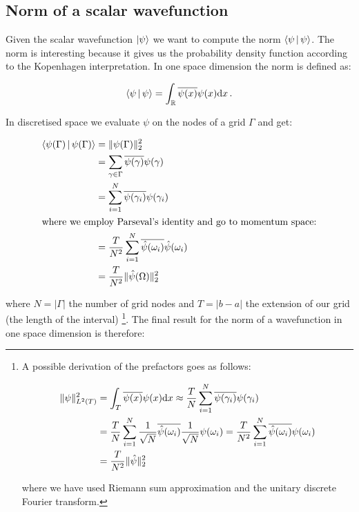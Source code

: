 \subsection{Norm of a scalar wavefunction}
\label{sec:norm_wf}


Given the scalar wavefunction $\Ket{\psi}$ we want to compute the norm $\Braket{\psi|\psi}$.
The norm is interesting because it gives us the probability density function
according to the Kopenhagen interpretation. In one space dimension the norm is
defined as:

\begin{equation*}
  \Braket{\psi|\psi} = \int_{\mathbb{R}} \overline{\psi(x)} \psi(x) \mathrm{d}x \,.
\end{equation*}

In discretised space we evaluate $\psi$ on the nodes of a grid $\Gamma$ and get:

\begin{align*}
  \Braket{\psi(\Gamma)|\psi(\Gamma)} & = \|\psi(\Gamma)\|^2_2 \\
                                     & = \sum_{\gamma \in \Gamma}  \overline{\psi(\gamma)} \psi(\gamma) \\
                                     & = \sum_{i=1}^{N} \overline{\psi(\gamma_i)} \psi(\gamma_i) \\
\intertext{where we employ Parseval's identity and go to momentum space:}
                                     & = \frac{T}{N^2} \sum_{i=1}^{N} \overline{\hat{\psi}(\omega_i)} \hat{\psi}(\omega_i) \\
                                     & = \frac{T}{N^2} \|\hat{\psi}(\Omega)\|^2_2
\end{align*}

where $N = |\Gamma|$ the number of grid nodes and $T = |b-a|$ the extension of
our grid (the length of the interval) \footnote{A possible derivation of the prefactors
goes as follows:

\begin{align*}
  \|\psi\|_{L^2(T)}^2 & = \int_{T} \overline{\psi(x)} \psi(x) \mathrm{d}x
                        \approx \frac{T}{N} \sum_{i=1}^{N} \overline{\psi(\gamma_i)} \psi(\gamma_i) \\
                      & = \frac{T}{N} \sum_{i=1}^{N} \frac{1}{\sqrt{N}} \overline{\hat{\psi}(\omega_i)} \frac{1}{\sqrt{N}} \psi(\omega_i)
                        = \frac{T}{N^2} \sum_{i=1}^{N} \overline{\hat{\psi}(\omega_i)} \psi(\omega_i) \\
                      & = \frac{T}{N^2} \|\hat{\psi}\|_2^2
\end{align*}

where we have used Riemann sum approximation and the unitary discrete Fourier transform.}.
The final result for the norm of a wavefunction in one space dimension is therefore:

